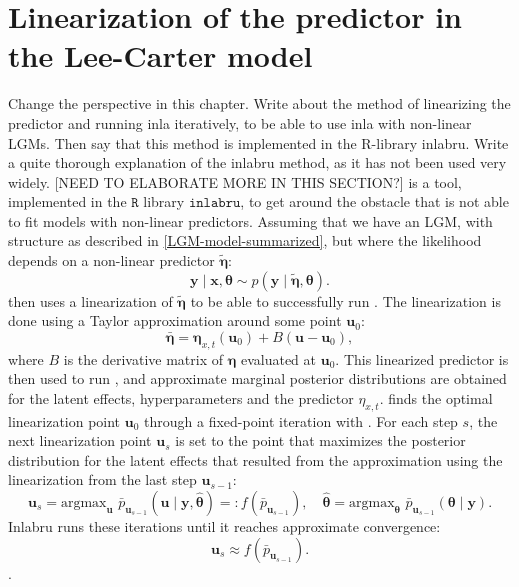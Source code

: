 \newpage
\section{Linearization of the predictor in the Lee-Carter model}
\textcolor{myDarkGreen}{
Change the perspective in this chapter. Write about the method of linearizing the predictor and running inla iteratively, to be able to use inla with non-linear LGMs. Then say that this method is implemented in the R-library inlabru. Write a quite thorough explanation of the inlabru method, as it has not been used very widely. 
}
[NEED TO ELABORATE MORE IN THIS SECTION?]
\inlabru is a tool, implemented in the $\texttt{R}$ library $\texttt{inlabru}$, to get around the obstacle that \inla is not able to fit models with non-linear predictors. 
Assuming that we have an LGM, with structure as described in \ref{LGM-model-summarized}, but where the likelihood depends on a non-linear predictor $\tilde{\boldsymbol{\eta}}$:
\begin{equation}
    \textbf{y}\mid\textbf{x},\boldsymbol{\theta} \sim p(\textbf{y}\mid \tilde{\boldsymbol{\eta}}, \boldsymbol{\theta}).
    \label{Eq:non-linear-predictor}
\end{equation}
\inlabru then uses a linearization of $\tilde{\boldsymbol{\eta}}$ to be able to successfully run \inla. The linearization is done using a Taylor approximation around some point $\textbf{u}_0$:
\begin{equation}
    \bar{\boldsymbol{\eta}} = \boldsymbol{\eta}_{x,t}(\textbf{u}_0) + B(\textbf{u} - \textbf{u}_0),
\end{equation}
where $B$ is the derivative matrix of $\boldsymbol{\eta}$ evaluated at $\textbf{u}_0$. This linearized predictor is then used to run \inla, and approximate marginal posterior distributions are obtained for the latent effects, hyperparameters and the predictor $\eta_{x,t}$. 
\inlabru finds the optimal linearization point $\textbf{u}_0$ through a fixed-point iteration with \inla. For each step $s$, the next linearization point $\textbf{u}_s$ is set to the point that maximizes the posterior distribution for the latent effects that resulted from the \inla approximation using the linearization from the last step $\textbf{u}_{s-1}$:
\begin{equation}
\textbf{u}_{s} = \text{argmax}_{\textbf{u}}\,\,\bar{p}_{\textbf{u}_{s-1}}(\textbf{u}\mid \textbf{y}, \hat{\boldsymbol{\theta}}) =: f(\bar{p}_{\textbf{u}_{s-1}}), \quad \hat{\boldsymbol{\theta}} = \text{argmax}_{\boldsymbol{\theta}}\,\,\bar{p}_{\textbf{u}_{s-1}}(\boldsymbol{\theta}\mid \textbf{y}).
\end{equation}
Inlabru runs these iterations until it reaches approximate convergence:
\begin{equation}
\textbf{u}_s \approx f(\bar{p}_{\textbf{u}_{s-1}}).
\end{equation}\cite{Inlabru}.

